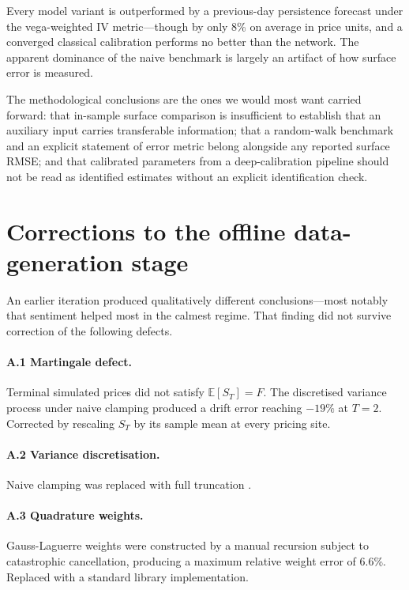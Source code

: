 \documentclass[11pt,a4paper]{article}
\begin{document}
Every model variant is outperformed by a previous-day persistence forecast under
the vega-weighted IV metric---though by only 8\% on average in price units, and a
converged classical calibration performs no better than the network. The
apparent dominance of the naive benchmark is largely an artifact of how surface
error is measured.

The methodological conclusions are the ones we would most want carried forward:
that in-sample surface comparison is insufficient to establish that an auxiliary
input carries transferable information; that a random-walk benchmark and an
explicit statement of error metric belong alongside any reported surface RMSE;
and that calibrated parameters from a deep-calibration pipeline should not be
read as identified estimates without an explicit identification check.

\appendix
\section{Corrections to the offline data-generation stage}
\label{app:corrections}

An earlier iteration produced qualitatively different conclusions---most notably
that sentiment helped most in the calmest regime. That finding did not survive
correction of the following defects.

\paragraph{A.1 Martingale defect.} Terminal simulated prices did not satisfy
$\mathbb{E}[S_T] = F$. The discretised variance process under naive clamping
produced a drift error reaching $-19\%$ at $T = 2$. Corrected by rescaling $S_T$
by its sample mean at every pricing site.

\paragraph{A.2 Variance discretisation.} Naive clamping was replaced with full
truncation \citep{lord2010}.

\paragraph{A.3 Quadrature weights.} Gauss-Laguerre weights were constructed by a
manual recursion subject to catastrophic cancellation, producing a maximum
relative weight error of 6.6\%. Replaced with a standard library implementation.
\end{document}
